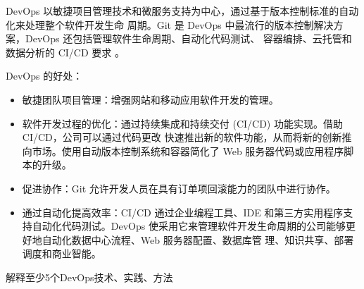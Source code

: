 \begin{solution}
DevOps 以敏捷项目管理技术和微服务支持为中心，通过基于版本控制标准的自动化来处理整个软件开发生命 周期。Git 是 DevOps 中最流行的版本控制解决方案，DevOps 还包括管理软件生命周期、自动化代码测试、 容器编排、云托管和数据分析的 CI/CD 要求 。

DevOps 的好处：
\begin{itemize}
    \item 敏捷团队项目管理：增强网站和移动应用软件开发的管理。
    \item 软件开发过程的优化：通过持续集成和持续交付 (CI/CD) 功能实现。借助 CI/CD，公司可以通过代码更改 快速推出新的软件功能，从而将新的创新推向市场。使用自动版本控制系统和容器简化了 Web 服务器代码或应用程序脚本的升级。
    \item 促进协作：Git 允许开发人员在具有订单项回滚能力的团队中进行协作。
    \item 通过自动化提高效率：CI/CD 通过企业编程工具、IDE 和第三方实用程序支持自动化代码测试。DevOps 使采用它来管理软件开发生命周期的公司能够更好地自动化数据中心流程、Web 服务器配置、数据库管 理、知识共享、部署调度和商业智能。
\end{itemize}
\end{solution}



\begin{problem}[2021]
解释至少5个DevOps技术、实践、方法
\end{problem}

